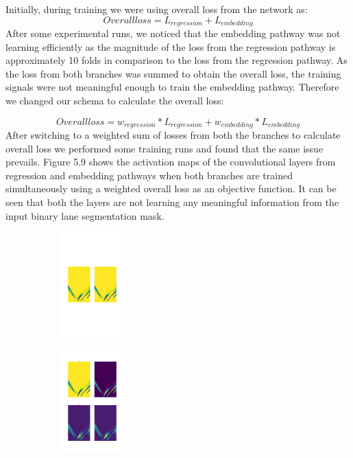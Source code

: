 Initially, during training we were using overall loss from the network as: 
\begin{equation}
    Overall loss = L_{regression} + L_{embedding} 
\end{equation}
After some experimental runs, we noticed that the embedding pathway was not learning efficiently as the magnitude of the loss from the regression pathway is approximately 10 folds in comparison to the loss from the regression pathway. As the loss from both branches was summed to obtain the overall loss, the training signals were not meaningful enough to train the embedding pathway. Therefore we changed our schema to calculate the overall loss:

\begin{equation}
    Overall loss = w_{regression} * L_{regression} + w_{embedding} * L_{embedding} 
\end{equation}
 After switching to a weighted sum of losses from both the branches to calculate overall loss we performed some training runs and found that the same issue prevails. Figure 5.9 shows the activation maps of the convolutional layers from regression and embedding pathways when both branches are trained simultaneously using a weighted overall loss as an objective function. It can be seen that both the layers are not learning any meaningful information from the input binary lane segmentation mask.  
 
 \begin{figure}[h]
      \caption{Activation maps of convolutional layers (a) embedding pathway (b) regression pathway, while training them simultaneously}
        \centering
        \begin{subfigure}{0.5\textwidth}
        \includegraphics[width=1\linewidth, height=4cm]{images/activation_embededing_nofix.png} 
        \caption{}
        \label{fig:subim1}
        \end{subfigure}
        \begin{subfigure}{0.5\textwidth}
        \includegraphics[width=1\linewidth,height=4cm]{images/embedding_regression_nofix.png}
        \caption{}
        \label{fig:subim2}
        \end{subfigure}
        \end{figure}

